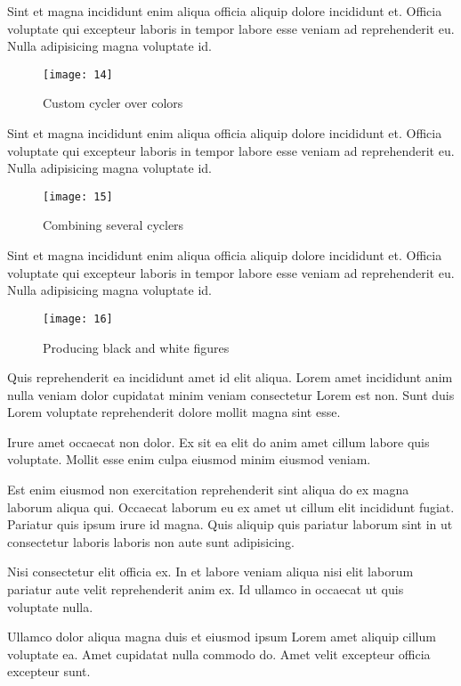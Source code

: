 Sint et magna incididunt enim aliqua officia aliquip dolore incididunt et. Officia voluptate qui excepteur laboris in tempor labore esse veniam ad reprehenderit eu. Nulla adipisicing magna voluptate id.

\begin{figure}[!h]
    \centering
    \texttt{[image: 14]}
    \caption{Custom cycler over colors}
    \label{fig:custom_colors}
\end{figure}


Sint et magna incididunt enim aliqua officia aliquip dolore incididunt et. Officia voluptate qui excepteur laboris in tempor labore esse veniam ad reprehenderit eu. Nulla adipisicing magna voluptate id.

\begin{figure}[!h]
    \centering
    \texttt{[image: 15]}
    \caption{Combining several cyclers}
    \label{fig:combining}
\end{figure}

Sint et magna incididunt enim aliqua officia aliquip dolore incididunt et. Officia voluptate qui excepteur laboris in tempor labore esse veniam ad reprehenderit eu. Nulla adipisicing magna voluptate id.

\begin{figure}[!h]
    \centering
    \texttt{[image: 16]}
    \caption{Producing black and white figures}
    \label{fig:black_n_white}
\end{figure}

Quis reprehenderit ea incididunt amet id elit aliqua. Lorem amet incididunt anim nulla veniam dolor cupidatat minim veniam consectetur Lorem est non. Sunt duis Lorem voluptate reprehenderit dolore mollit magna sint esse.

Irure amet occaecat non dolor. Ex sit ea elit do anim amet cillum labore quis voluptate. Mollit esse enim culpa eiusmod minim eiusmod veniam.

Est enim eiusmod non exercitation reprehenderit sint aliqua do ex magna laborum aliqua qui. Occaecat laborum eu ex amet ut cillum elit incididunt fugiat. Pariatur quis ipsum irure id magna. Quis aliquip quis pariatur laborum sint in ut consectetur laboris laboris non aute sunt adipisicing.

Nisi consectetur elit officia ex. In et labore veniam aliqua nisi elit laborum pariatur aute velit reprehenderit anim ex. Id ullamco in occaecat ut quis voluptate nulla.

Ullamco dolor aliqua magna duis et eiusmod ipsum Lorem amet aliquip cillum voluptate ea. Amet cupidatat nulla commodo do. Amet velit excepteur officia excepteur sunt.

